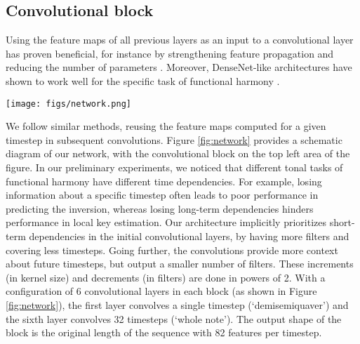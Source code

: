 \documentclass{article}
\newcommand{\guide}[1]{}
\begin{document}
\subsection{Convolutional block}

\guide{Micchi and DenseNet-like convolutions.}
Using the feature maps of all previous layers as an input to a convolutional layer has proven beneficial, for instance by strengthening feature propagation and reducing the number of parameters \cite{huang_densely_2017}. 
Moreover, DenseNet-like architectures have shown to work well for the specific task of functional harmony \cite{micchi_not_2020}.

\begin{figure*}
 \centerline{
 \texttt{[image: figs/network.png]}}
 \caption{\emph{AugmentedNet}. The bass and chroma inputs are processed through independent convolutional blocks and then concatenated. Both convolutional blocks are identical and expanded on the top of the figure. A convolutional block has six 1D convolutional layers. Each layer doubles the kernel size (number of timesteps covered) and halves the number of output filters, prioritizing short-term dependencies but providing long-term context that benefits the subsequent GRU layers.}
 \label{fig:network}
\end{figure*}

\guide{Convolutional layers.}
We follow similar methods, reusing the feature maps computed for a given timestep in subsequent convolutions. 
Figure \ref{fig:network} provides a schematic diagram of our network, with the convolutional block on the top left area of the figure. 
In our preliminary experiments, we noticed that different tonal tasks of functional harmony have different time dependencies. 
For example, losing information about a specific timestep often leads to poor performance in predicting the inversion, whereas losing long-term dependencies hinders performance in local key estimation. 
Our architecture implicitly prioritizes short-term dependencies in the initial convolutional layers, by having more filters and covering less timesteps. Going further, the convolutions provide more context about future timesteps, but output a smaller number of filters. These increments (in kernel size) and decrements (in filters) are done in powers of 2. With a configuration of 6 convolutional layers in each block (as shown in Figure \ref{fig:network}), the first layer convolves a single timestep (`demisemiquaver') and the sixth layer convolves 32 timesteps (`whole note'). The output shape of the block is the original length of the sequence with 82 features per timestep.
\end{document}
